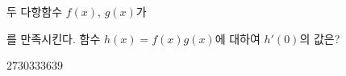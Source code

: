 두 다항함수 $f(x)$, $g(x)$가 \par\smallskip{}\par\smallskip\noindent 를 만족시킨다. 함수 $h(x)=f(x)g(x)$에 대하여 $h'(0)$의 값은?
\begin{choices32}{$27$}{$30$}{$33$}{$36$}{$39$}\end{choices32}

